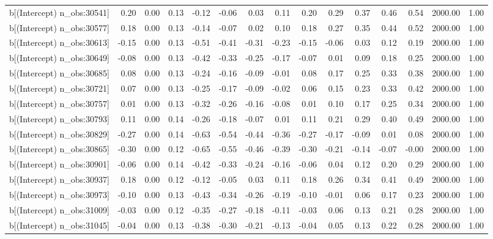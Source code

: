 \begin{table}[ht]
\begin{tabular}{rrrrrrrrrrrrrrr}
  b[(Intercept) n\_obs:30541] & 0.20 & 0.00 & 0.13 & -0.12 & -0.06 & 0.03 & 0.11 & 0.20 & 0.29 & 0.37 & 0.46 & 0.54 & 2000.00 & 1.00 \\ 
  b[(Intercept) n\_obs:30577] & 0.18 & 0.00 & 0.13 & -0.14 & -0.07 & 0.02 & 0.10 & 0.18 & 0.27 & 0.35 & 0.44 & 0.52 & 2000.00 & 1.00 \\ 
  b[(Intercept) n\_obs:30613] & -0.15 & 0.00 & 0.13 & -0.51 & -0.41 & -0.31 & -0.23 & -0.15 & -0.06 & 0.03 & 0.12 & 0.19 & 2000.00 & 1.00 \\ 
  b[(Intercept) n\_obs:30649] & -0.08 & 0.00 & 0.13 & -0.42 & -0.33 & -0.25 & -0.17 & -0.07 & 0.01 & 0.09 & 0.18 & 0.25 & 2000.00 & 1.00 \\ 
  b[(Intercept) n\_obs:30685] & 0.08 & 0.00 & 0.13 & -0.24 & -0.16 & -0.09 & -0.01 & 0.08 & 0.17 & 0.25 & 0.33 & 0.38 & 2000.00 & 1.00 \\ 
  b[(Intercept) n\_obs:30721] & 0.07 & 0.00 & 0.13 & -0.25 & -0.17 & -0.09 & -0.02 & 0.06 & 0.15 & 0.23 & 0.33 & 0.42 & 2000.00 & 1.00 \\ 
  b[(Intercept) n\_obs:30757] & 0.01 & 0.00 & 0.13 & -0.32 & -0.26 & -0.16 & -0.08 & 0.01 & 0.10 & 0.17 & 0.25 & 0.34 & 2000.00 & 1.00 \\ 
  b[(Intercept) n\_obs:30793] & 0.11 & 0.00 & 0.14 & -0.26 & -0.18 & -0.07 & 0.01 & 0.11 & 0.21 & 0.29 & 0.40 & 0.49 & 2000.00 & 1.00 \\ 
  b[(Intercept) n\_obs:30829] & -0.27 & 0.00 & 0.14 & -0.63 & -0.54 & -0.44 & -0.36 & -0.27 & -0.17 & -0.09 & 0.01 & 0.08 & 2000.00 & 1.00 \\ 
  b[(Intercept) n\_obs:30865] & -0.30 & 0.00 & 0.12 & -0.65 & -0.55 & -0.46 & -0.39 & -0.30 & -0.21 & -0.14 & -0.07 & -0.00 & 2000.00 & 1.00 \\ 
  b[(Intercept) n\_obs:30901] & -0.06 & 0.00 & 0.14 & -0.42 & -0.33 & -0.24 & -0.16 & -0.06 & 0.04 & 0.12 & 0.20 & 0.29 & 2000.00 & 1.00 \\ 
  b[(Intercept) n\_obs:30937] & 0.18 & 0.00 & 0.12 & -0.12 & -0.05 & 0.03 & 0.11 & 0.18 & 0.26 & 0.34 & 0.41 & 0.49 & 2000.00 & 1.00 \\ 
  b[(Intercept) n\_obs:30973] & -0.10 & 0.00 & 0.13 & -0.43 & -0.34 & -0.26 & -0.19 & -0.10 & -0.01 & 0.06 & 0.17 & 0.23 & 2000.00 & 1.00 \\ 
  b[(Intercept) n\_obs:31009] & -0.03 & 0.00 & 0.12 & -0.35 & -0.27 & -0.18 & -0.11 & -0.03 & 0.06 & 0.13 & 0.21 & 0.28 & 2000.00 & 1.00 \\ 
  b[(Intercept) n\_obs:31045] & -0.04 & 0.00 & 0.13 & -0.38 & -0.30 & -0.21 & -0.13 & -0.04 & 0.05 & 0.13 & 0.22 & 0.28 & 2000.00 & 1.00 \\ 

\end{tabular}
\end{table}
